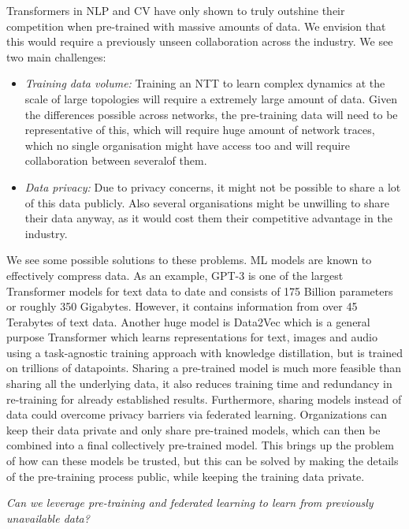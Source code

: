 Transformers in NLP and CV have only shown to truly outshine their competition when pre-trained with massive amounts of data. We envision that this would require a previously unseen collaboration across the industry. We see two main challenges:
\begin{itemize}
\item \emph{Training data volume:} Training an NTT to learn complex dynamics at the scale of large topologies will require a extremely large amount of data. Given the differences possible across networks, the pre-training data will need to be representative of this, which will require huge amount of network traces, which no single organisation might have access too and will require collaboration between severalof them.
\item \emph{Data privacy:} Due to privacy concerns, it might not be possible to share a lot of this data publicly. Also several organisations might be unwilling to share their data anyway, as it would cost them their competitive advantage in the industry.
\end{itemize}


We see some possible solutions to these problems. ML models are known to effectively compress data. As an example, GPT-3\cite{brownLanguageModelsAre2020} is one of the largest Transformer models for text data to date and consists of 175 Billion parameters or roughly 350 Gigabytes. However, it contains information from over 45 Terabytes of text data. Another huge model is Data2Vec\cite{baevskiData2vecGeneralFramework2022} which is a general purpose Transformer which learns representations for text, images and audio using a task-agnostic training approach with knowledge distillation\cite{kd}, but is trained on trillions of datapoints. Sharing a pre-trained model is much more feasible than sharing all the underlying data, it also reduces training time and redundancy in re-training for already established results.
Furthermore, sharing models instead of data could overcome privacy barriers via federated learning\cite{kairouzAdvancesOpenProblems2021}. Organizations can keep their data private and only share pre-trained models, which can then be combined into a final collectively pre-trained model. This brings up the problem of how can these models be trusted, but this can be solved by making the details of the pre-training process public, while keeping the training data private.

\emph{Can we leverage pre-training and federated learning to learn from previously unavailable data?}

